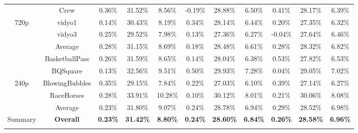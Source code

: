 \documentclass[lettersize,journal]{IEEEtran}
\begin{document}
\begin{table}[!h]
\begin{tabular}{c | c | c   c   c | c   c   c | c   c   c }
	           & Crew           & 0.36\% & 31.52\% & 8.56\% &-0.19\% & 28.88\% & 6.50\% & 0.41\% & 28.17\% & 6.39\% \\  
	     720p  & vidyo1         & 0.14\% & 30.43\% & 8.19\% & 0.34\% & 28.14\% & 6.44\% & 0.20\% & 27.35\% & 6.32\% \\             
	           & vidyo3         & 0.25\% & 29.52\% & 7.98\% & 0.13\% & 27.36\% & 6.27\% &-0.04\% & 27.64\% & 6.46\% \\   
	    \cmidrule[0.75pt]{2-11} 
	           & Average        & 0.28\% & 31.15\% & 8.69\% & 0.18\% & 28.48\% & 6.61\% & 0.28\% & 28.32\% & 6.82\% \\ 
	    \cmidrule[0.75pt]{1-11}  
	           & BasketballPass & 0.26\% & 31.59\% & 8.65\% & 0.14\% & 28.04\% & 6.38\% & 0.53\% & 27.82\% & 6.53\% \\          
	           & BQSquare       & 0.13\% & 32.56\% & 9.51\% & 0.50\% & 29.93\% & 7.28\% & 0.04\% & 29.05\% & 7.02\% \\  
	     240p  & BlowingBubbles & 0.35\% & 29.15\% & 7.84\% & 0.22\% & 27.03\% & 6.10\% & 0.39\% & 27.14\% & 6.27\% \\             
	           & RaceHorses     & 0.28\% & 33.91\% &10.28\% & 0.10\% & 30.12\% & 8.01\% & 0.21\% & 30.06\% & 8.08\% \\   
	    \cmidrule[0.75pt]{2-11} 
	           & Average        & 0.23\% & 31.80\% & 9.07\% & 0.24\% & 28.78\% & 6.94\% & 0.29\% & 28.52\% & 6.98\% \\ 
	    \cmidrule[0.75pt]{1-11} 
	    Summary & \textbf{Overall} & \textbf{0.23\%} & \textbf{31.42\%} & \textbf{8.80\%} & \textbf{0.24\%} & \textbf{28.60\%} & \textbf{6.84\%} & \textbf{0.26\%} & \textbf{28.58\%} & \textbf{6.96\%} \\ 
		\midrule[0.75pt] \specialrule{0em}{0.35pt}{0.35pt} \midrule[0.75pt] %
	\end{tabular}
\end{table}
\end{document}
